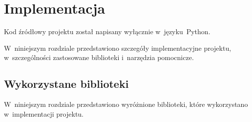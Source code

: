 \documentclass[thesis]{subfiles}
\begin{document}
\chapter{Implementacja}

Kod źródłowy projektu został napisany wyłącznie w~języku~Python.

W~niniejszym rozdziale przedstawiono szczegóły implementacyjne projektu, w~szczególności zastosowane biblioteki i~narzędzia pomocnicze.


\section{Wykorzystane biblioteki}

W~niniejszym rozdziale przedstawiono wyróżnione biblioteki, które wykorzystano w~implementacji projektu.
\end{document}
